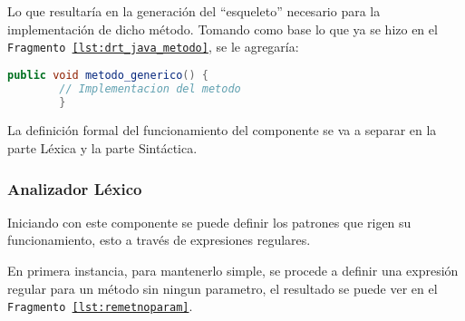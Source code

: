 Lo que resultaría en la generación del ``esqueleto'' necesario para la
implementación de dicho método. Tomando como base lo que ya se hizo en
el \texttt{Fragmento \ref{lst:drt_java_metodo}}, se le agregaría:

\begin{lstlisting}[caption={Java - Generación metodo\_generico agregado en
\texttt{Fragmento \ref{lst:drt_java_modelo_metodo_generico}}}, language=Java, basicstyle=\footnotesize\ttfamily]
  public void metodo_generico() {
		// Implementacion del metodo
		}
\end{lstlisting}

La definición formal del funcionamiento del componente se va a separar en la
parte Léxica y la parte Sintáctica.

\subsubsection{Analizador Léxico}

Iniciando con este componente se puede definir los patrones que rigen su
funcionamiento, esto a través de expresiones regulares.

En primera instancia, para mantenerlo simple, se procede a definir una
expresión regular para un método sin ningun parametro, el resultado se puede
ver en el \texttt{Fragmento \ref{lst:remetnoparam}}.

